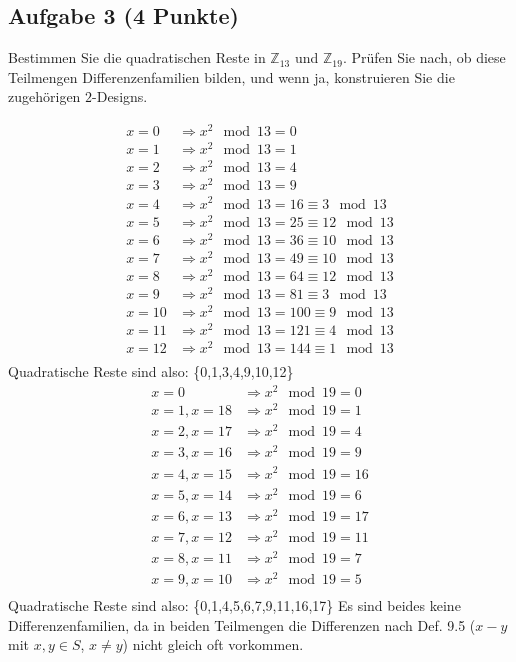 \documentclass{article} %
\begin{document}
\subsection*{Aufgabe 3 (4 Punkte)}
Bestimmen Sie die quadratischen Reste in $\mathbb{Z}_{13}$ und $\mathbb{Z}_{19}$. Prüfen Sie nach, ob diese Teilmengen Differenzenfamilien bilden, und wenn ja, konstruieren Sie die zugehörigen $2$-Designs.
\begin{mybox}
\begin{align*}
    x=0 & \Rightarrow x^2 \mod 13 = 0 \\
    x= 1 & \Rightarrow x^2 \mod 13 = 1 \\
    x= 2 & \Rightarrow x^2 \mod 13 = 4 \\
    x= 3 & \Rightarrow x^2 \mod 13 = 9 \\
    x= 4 & \Rightarrow x^2 \mod 13 = 16 \equiv 3 \mod 13 \\
    x= 5 & \Rightarrow x^2 \mod 13 = 25 \equiv 12 \mod 13 \\
    x= 6 & \Rightarrow x^2 \mod 13 = 36 \equiv 10 \mod 13 \\
    x= 7 & \Rightarrow x^2 \mod 13 = 49 \equiv 10 \mod 13 \\
    x= 8 & \Rightarrow x^2 \mod 13 = 64 \equiv 12 \mod 13 \\
    x= 9 & \Rightarrow x^2 \mod 13 = 81 \equiv 3 \mod 13 \\ 
    x= 10 & \Rightarrow x^2 \mod 13 = 100 \equiv 9 \mod 13 \\ 
    x= 11 & \Rightarrow x^2 \mod 13 = 121 \equiv 4 \mod 13 \\
    x= 12 & \Rightarrow x^2 \mod 13 = 144 \equiv 1 \mod 13 \\ 
\end{align*}
Quadratische Reste sind also: \{0,1,3,4,9,10,12\} 
\begin{align*}
    x=0 & \Rightarrow x^2 \mod 19 = 0 \\
    x=1, x = 18 & \Rightarrow x^2 \mod 19 = 1 \\
    x=2, x = 17 & \Rightarrow x^2 \mod 19 = 4 \\
    x=3, x = 16 & \Rightarrow x^2 \mod 19 = 9 \\
    x=4, x = 15 & \Rightarrow x^2 \mod 19 = 16 \\
    x=5, x = 14 & \Rightarrow x^2 \mod 19 = 6 \\
    x=6, x = 13 & \Rightarrow x^2 \mod 19 = 17 \\
    x=7, x = 12 & \Rightarrow x^2 \mod 19 = 11 \\
    x=8, x = 11 & \Rightarrow x^2 \mod 19 = 7 \\
    x=9, x = 10 & \Rightarrow x^2 \mod 19 = 5 \\
\end{align*}
Quadratische Reste sind also: \{0,1,4,5,6,7,9,11,16,17\}
Es sind beides keine Differenzenfamilien, da in beiden Teilmengen die Differenzen nach Def. 9.5 ($x-y$ mit $x, y \in S$, $x \neq y$) nicht gleich oft vorkommen. 
\end{mybox}
\newpage
\end{document}
